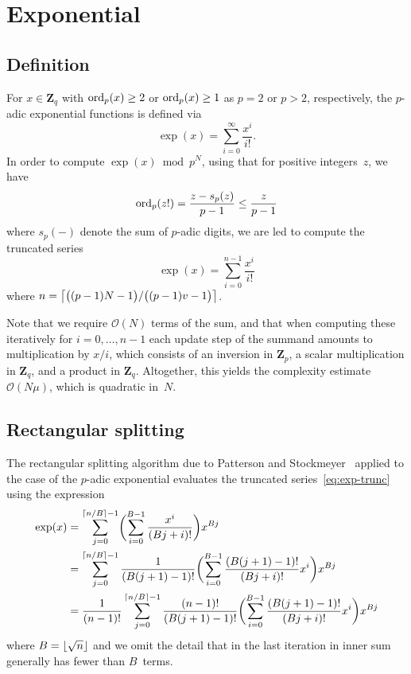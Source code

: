 \section{Exponential}

\subsection{Definition}

For $x \in \mathbf{Z}_q$ with $\operatorname{ord}_p(x) \geq 2$ or $\operatorname{ord}_p(x) \geq 1$ 
as $p=2$ or $p > 2$, respectively, the $p$-adic exponential functions is 
defined via 
\begin{equation}
\exp(x) = \sum_{i = 0}^{\infty} \frac{x^i}{i!}.
\end{equation}
In order to compute $\exp(x) \bmod{p^N}$, using that for positive 
integers~$z$, we have
\begin{equation}
\operatorname{ord}_p(z!) = \frac{z - s_p(z)}{p - 1} \leq \frac{z}{p - 1}
\end{equation}
where $s_p(-)$ denote the sum of $p$-adic digits, we are led to compute 
the truncated series 
\begin{equation} \label{eq:exp-trunc}
\exp(x) = \sum_{i = 0}^{n-1} \frac{x^i}{i!}
\end{equation}
where $n = \bigl\lceil\bigl( (p-1)N - 1 \bigr) / \bigl( (p-1)v - 1 \bigr)\bigr\rceil$.

Note that we require $\mathcal{O}(N)$ terms of the sum, 
and that when computing these iteratively for $i = 0, \dotsc, n-1$ 
each update step of the summand amounts to multiplication by $x / i$, 
which consists of an inversion in $\mathbf{Z}_p$, a scalar multiplication 
in $\mathbf{Z}_q$, and a product in $\mathbf{Z}_q$.  Altogether, this 
yields the complexity estimate $\mathcal{O}(N \mu)$, which is quadratic 
in~$N$.

\subsection{Rectangular splitting}

The rectangular splitting algorithm due to Patterson and 
Stockmeyer~\citep{PatersonStockmeyer1973} applied to the 
case of the $p$-adic exponential evaluates the truncated 
series~\eqref{eq:exp-trunc} using the expression 
\begin{align}
\exp(x) & = \sum_{j=0}^{\left\lceil n/B\right\rceil - 1} 
            \biggl( \sum_{i=0}^{B-1} \frac{x^i}{(Bj + i)!} \biggr) x^{Bj} \\
        & = \sum_{j=0}^{\left\lceil n/B\right\rceil - 1} 
            \frac{1}{(B (j+1) - 1)!} \biggl( \sum_{i=0}^{B-1} \frac{(B (j+1) - 1)!}{(Bj + i)!} x^i \biggr) x^{Bj} \\
        & = \frac{1}{(n-1)!} \sum_{j=0}^{\left\lceil n/B\right\rceil - 1} 
            \frac{(n-1)!}{(B (j+1) - 1)!} \biggl( \sum_{i=0}^{B-1} \frac{(B (j+1) - 1)!}{(Bj + i)!} x^i \biggr) x^{Bj}
\end{align}
where $B = \lfloor\sqrt{n}\rfloor$ and we omit the detail that 
in the last iteration in inner sum generally has fewer than 
$B$~terms.

